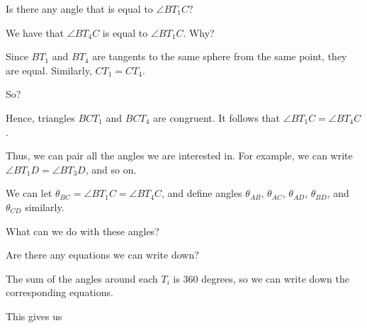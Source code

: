 




Is there any angle that is equal to $\angle BT_1 C?$


We have that $\angle BT_4 C$ is equal to $\angle BT_1 C$. Why?


Since $BT_1$ and $BT_4$ are tangents to the same sphere from the same point, they are equal. Similarly, $CT_1 = CT_4$.

So?



Hence, triangles $BCT_1$ and $BCT_4$ are congruent. It follows that $\angle BT_1 C = \angle BT_4 C$.

Thus, we can pair all the angles we are interested in. For example, we can write $\angle BT_1 D = \angle BT_3 D$, and so on.

We can let $\theta_{BC} = \angle BT_1 C = \angle BT_4 C$, and define angles $\theta_{AB}$, $\theta_{AC}$, $\theta_{AD}$, $\theta_{BD}$, and $\theta_{CD}$ similarly.

What can we do with these angles?

Are there any equations we can write down?


The sum of the angles around each $T_i$ is 360 degrees, so we can write down the corresponding equations.

This gives us


